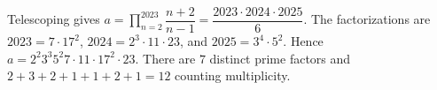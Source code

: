 Telescoping gives $a=\prod_{n=2}^{2023}\dfrac{n+2}{n-1}=\dfrac{2023\cdot2024\cdot2025}{6}$. The factorizations are $2023=7\cdot17^2$, $2024=2^3\cdot11\cdot23$, and $2025=3^4\cdot5^2$. Hence $\boxed{a=2^2 3^3 5^2 7\cdot11\cdot17^2\cdot23}$. There are $\boxed7$ distinct prime factors and $2+3+2+1+1+2+1=\boxed{12}$ counting multiplicity.

